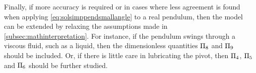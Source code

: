Finally, if more accuracy is required or in cases where less agreement is found when applying \cref{eq:solsimppendsmallangle} to a real pendulum, then the model can be extended by relaxing the assumptions made in \cref{subsec:mathinterpretation}. For instance, if the pendulum swings through a viscous fluid, such as a liquid, then the dimensionless quantities $\Pi_8$ and $\Pi_9$ should be included. Or, if there is little care in lubricating the pivot, then $\Pi_4$, $\Pi_5$ and $\Pi_6$ should be further studied.
